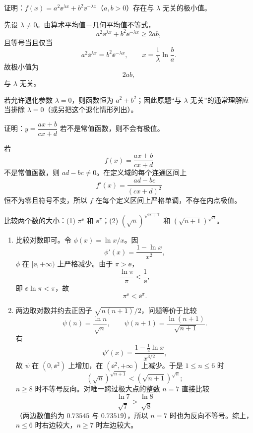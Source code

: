 \begin{xexercise}[4]
证明：$f(x)=a^2\ee^{\lambda x}+b^2\ee^{-\lambda x}$（$a,b>0$）存在与 $\lambda$ 无关的极小值。
\end{xexercise}
\begin{xsolution}
先设 $\lambda\ne0$。由算术平均值－几何平均值不等式，
\[
  a^2\ee^{\lambda x}+b^2\ee^{-\lambda x}
  \ge2ab,
\]
且等号当且仅当
\[
  a^2\ee^{\lambda x}=b^2\ee^{-\lambda x},
  \qquad
  x=\frac1\lambda\ln\frac ba.
\]
故极小值为
\[
  \boxed{2ab},
\]
与 $\lambda$ 无关。

若允许退化参数 $\lambda=0$，则函数恒为 $a^2+b^2$；因此原题“与 $\lambda$ 无关”的通常理解应当排除 $\lambda=0$（或另把这个退化情形列出）。
\end{xsolution}


\begin{xexercise}[5]
证明：$y=\dfrac{ax+b}{cx+d}$ 若不是常值函数，则不会有极值。
\end{xexercise}
\begin{xsolution}
若
\[
  f(x)=\frac{ax+b}{cx+d}
\]
不是常值函数，则 $ad-bc\ne0$。在定义域的每个连通区间上
\[
  f'(x)=\frac{ad-bc}{(cx+d)^2}
\]
恒不为零且符号不变，所以 $f$ 在每个定义区间上严格单调，不存在内点极值。
\end{xsolution}


\begin{xexercise}[6]
比较两个数的大小：(1) $\pi^{\ee}$ 和 $\ee^\pi$；(2) $(\sqrt n)^{\sqrt{n+1}}$ 和 $(\sqrt{n+1})^{\sqrt n}$。
\end{xexercise}
\begin{xsolution}
\begin{enumerate}[label=(\arabic*)]
  \item 比较对数即可。令 $\phi(x)=\ln x/x$。因
  \[
    \phi'(x)=\frac{1-\ln x}{x^2},
  \]
  $\phi$ 在 $[\ee,+\infty)$ 上严格减少。由于 $\pi>\ee$，
  \[
    \frac{\ln\pi}{\pi}<\frac1\ee,
  \]
  即 $\ee\ln\pi<\pi$，故
  \[
    \boxed{\pi^{\ee}<\ee^\pi}.
  \]

  \item 两边取对数并约去正因子 $\sqrt{n(n+1)}/2$，问题等价于比较
  \[
    \psi(n)=\frac{\ln n}{\sqrt n},
    \qquad
    \psi(n+1)=\frac{\ln(n+1)}{\sqrt{n+1}}.
  \]
  有
  \[
    \psi'(x)=\frac{1-\frac12\ln x}{x^{3/2}},
  \]
  故 $\psi$ 在 $(0,\ee^2)$ 上增加，在 $(\ee^2,+\infty)$ 上减少。于是 $1\le n\le6$ 时
  \[
    (\sqrt n)^{\sqrt{n+1}}<(\sqrt{n+1})^{\sqrt n};
  \]
  $n\ge8$ 时不等号反向。对唯一跨过极大点的整数 $n=7$ 直接比较
  \[
    \frac{\ln7}{\sqrt7}>\frac{\ln8}{\sqrt8}
  \]
  （两边数值约为 $0.73545$ 与 $0.73519$），所以 $n=7$ 时也为反向不等号。综上，$n\le6$ 时右边较大，$n\ge7$ 时左边较大。
\end{enumerate}
\end{xsolution}


